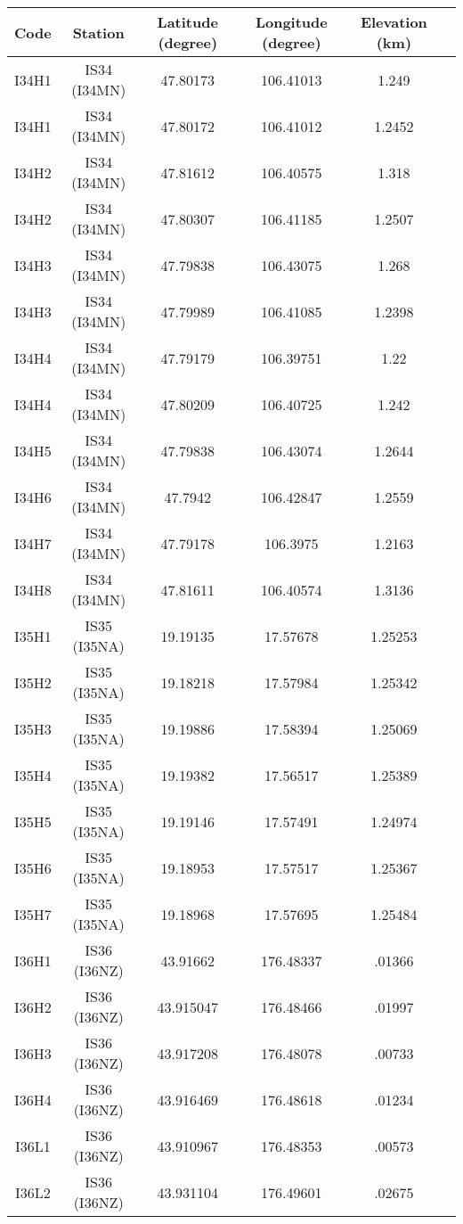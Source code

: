 \documentclass[a4paper, 10pt]{report}
\begin{document}
{\begin{center}
\begin{tabular}{|c|c|c|c|c|c|}
\hline
\end{tabular}
\end{center}
\begin{center}
\begin{tabular}{|c|c|c|c|c|c|}
\hline
Code&	Station&	Latitude (degree)&	Longitude (degree)&	Elevation (km)\\
\hline
I34H1&	IS34 (I34MN)&	 	47.80173&	106.41013&	1.249\\
I34H1&	IS34 (I34MN)&	 	47.80172&	106.41012&	1.2452\\
I34H2&	IS34 (I34MN)&	 	47.81612&	106.40575&	1.318\\
I34H2&	IS34 (I34MN)&	 	47.80307&	106.41185&	1.2507\\
I34H3&	IS34 (I34MN)&	 	47.79838&	106.43075&	1.268\\
I34H3&	IS34 (I34MN)&	 	47.79989&	106.41085&	1.2398\\
I34H4&	IS34 (I34MN)&	 	47.79179&	106.39751&	1.22\\
I34H4&	IS34 (I34MN)&	 	47.80209&	106.40725&	1.242\\
I34H5&	IS34 (I34MN)&	 	47.79838&	106.43074&	1.2644\\
I34H6&	IS34 (I34MN)&	 	47.7942&	106.42847&	1.2559\\
I34H7&	IS34 (I34MN)&	 	47.79178&	106.3975&	1.2163\\
I34H8&	IS34 (I34MN)&	 	47.81611&	106.40574&	1.3136\\
I35H1&	IS35 (I35NA)&	 	19.19135&	17.57678&	1.25253\\
I35H2&	IS35 (I35NA)&	 	19.18218&	17.57984&	1.25342\\
I35H3&	IS35 (I35NA)&	 	19.19886&	17.58394&	1.25069\\
I35H4&	IS35 (I35NA)&	 	19.19382&	17.56517&	1.25389\\
I35H5&	IS35 (I35NA)&	 	19.19146&	17.57491&	1.24974\\
I35H6&	IS35 (I35NA)&	 	19.18953&	17.57517&	1.25367\\
I35H7&	IS35 (I35NA)&	 	19.18968&	17.57695&	1.25484\\I36H1&	IS36 (I36NZ)&	 	43.91662&	176.48337&	.01366\\
I36H2&	IS36 (I36NZ)&	 	43.915047&	176.48466&	.01997\\
I36H3&	IS36 (I36NZ)&	 	43.917208&	176.48078&	.00733\\
I36H4&	IS36 (I36NZ)&	 	43.916469&	176.48618&	.01234\\
I36L1&	IS36 (I36NZ)&	 	43.910967&	176.48353&	.00573\\
I36L2&	IS36 (I36NZ)&	 	43.931104&	176.49601&	.02675\\

\end{tabular}
\end{center}}
\end{document}
